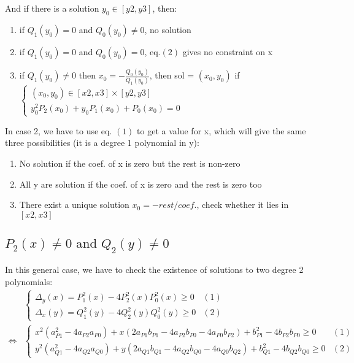 \documentclass[paper=a4, fontsize=11pt]{scrartcl}
\numberwithin{equation}{section}		%
\numberwithin{figure}{section}			%
\numberwithin{table}{section}				%
\begin{document}
And if there is a solution $y_0 \in [y2,y3]$, then:
\begin{enumerate}
\item if $Q_1(y_0)=0$ and $Q_0(y_0)\neq0$, no solution
\item if $Q_1(y_0)=0$ and $Q_0(y_0)=0$, eq.$(2)$ gives no constraint on x
\item if $Q_1(y_0)\neq0$ then $x_0 = -\frac{Q_0(y_0)}{Q_1(y_0)}$, then sol = $(x_0,y_0)$ if $\left\{\begin{array}{l}(x_0,y_0) \in [x2,x3]\times[y2,y3]\\y_0^2 P_2(x_0) + y_0P_1(x_0) + P_0(x_0) = 0 \end{array}\right.$
\end{enumerate}

In case 2, we have to use eq. $(1)$ to get a value for x, which will give the same three possibilities (it is a degree 1 polynomial in y):
\begin{enumerate}
\item No solution if the coef. of x is zero but the rest is non-zero
\item All y are solution if the coef. of x is zero and the rest is zero too
\item There exist a unique solution $x_0 = -rest/coef.$, check whether it lies in $[x2,x3]$
\end{enumerate}

\newpage
\subsection{$P_2(x)\neq0 \text{ and } Q_2(y)\neq0$}

In this general case, we have to check the existence of solutions to two degree 2 polynomials:
$$
\begin{array}{ll}
& \left \{
\begin{array}{ll}
\Delta_y(x) = P_1^2(x) - 4P_2^2(x)P_0^2(x) \geq 0 & (1)\\
\Delta_x(y) = Q_1^2(y) - 4Q_2^2(y)Q_0^2(y) \geq 0 & (2)
\end{array}
\right.\\
\Leftrightarrow & \left \{
\begin{array}{ll}
x^2 \left( a_{P1}^2-4a_{P2}a_{P0} \right) + x\left( 2a_{P1}b_{P1} - 4a_{P2}b_{P0} - 4a_{P0}b_{P2} \right) + b_{P1}^2-4b_{P2}b_{P0} \geq 0 & (1)\\
y^2 \left( a_{Q1}^2-4a_{Q2}a_{Q0} \right) + y\left( 2a_{Q1}b_{Q1} - 4a_{Q2}b_{Q0} - 4a_{Q0}b_{Q2} \right) + b_{Q1}^2-4b_{Q2}b_{Q0} \geq 0 & (2)
\end{array}
\right.
\end{array}
$$
\end{document}
